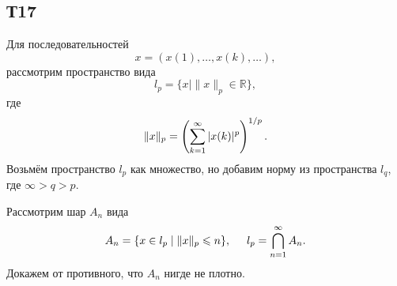 \subsection*{Т17}

Для последовательностей 
\begin{equation*}
    x = (x(1), \ldots, x(k), \ldots),
\end{equation*}
рассмотрим пространство вида
\begin{equation*}
    l_p = \{x \mid \|x\|_p \in \mathbb{R} \},
\end{equation*}
где 
\begin{equation*}
    \|x\|_p = \l(
        \sum_{k=1}^{\infty} |x(k)|^p
    \r)^{1/p}.
\end{equation*}
Возьмём пространство $l_p$ как множество, но добавим норму из пространства $l_q$, где $\infty > q > p$. 

Рассмотрим шар $A_n$ вида
\begin{equation*}
    A_n = \{x \in l_p \mid \|x\|_p \leq n\},
    \hspace{5 mm}
    l_p = \bigcap_{n=1}^{\infty} A_n.
\end{equation*}
Докажем от противного, что $A_n$ нигде не плотно. 

